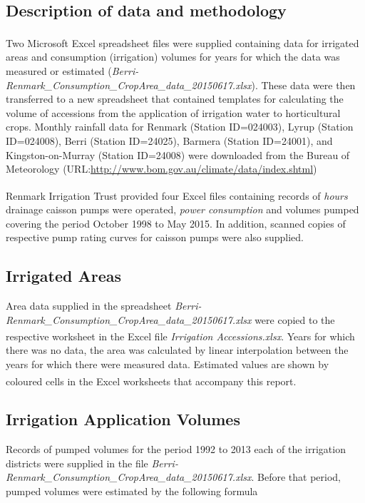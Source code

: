 \documentclass[a4paper, titlepage, 12pt]{article}\usepackage[]{graphicx}\usepackage[]{color}
\begin{document}
\begin{sffamily}
\section{Description of data and methodology}
Two Microsoft Excel\textsuperscript{\textregistered} spreadsheet files were supplied containing data for irrigated areas and consumption (irrigation) volumes for years for which the data was measured or estimated (\textit{Berri-Renmark\_Consumption\_CropArea\_data\_20150617.xlsx}). These data were then transferred to a new spreadsheet that contained templates for calculating the volume of accessions from the application of irrigation water to horticultural crops. Monthly rainfall data for Renmark (Station ID=024003), Lyrup (Station ID=024008), Berri (Station ID=24025), Barmera (Station ID=24001), and Kingston-on-Murray (Station ID=24008) were downloaded from the Bureau of Meteorology (URL:\url{http://www.bom.gov.au/climate/data/index.shtml})

Renmark Irrigation Trust provided four Excel\textsuperscript{\textregistered} files containing records of \textit{hours} drainage caisson pumps were operated, \textit{power consumption} and volumes pumped covering the period October 1998 to May 2015. In addition, scanned copies of respective pump rating curves for caisson pumps were also supplied.

\subsection{Irrigated Areas} \label{irrarea} Area data supplied in the spreadsheet \textit{Berri-Renmark\_Consumption\_CropArea\_data\_20150617.xlsx} were copied to the respective worksheet in the Excel\textsuperscript{\textregistered} file \textit{Irrigation Accessions.xlsx}. Years for which there was no data, the area was calculated by linear interpolation between the years for which there were measured data. Estimated values are shown by coloured cells in the Excel\textsuperscript{\textregistered} worksheets that accompany this report. 

\subsection{Irrigation Application Volumes} \label{irrvol} Records of pumped volumes for the period 1992 to 2013 each of the irrigation districts were supplied in the file \textit{Berri-Renmark\_Consumption\_CropArea\_data\_20150617.xlsx}. Before that period, pumped volumes were estimated by the following formula %
 

\end{sffamily}
\end{document}
